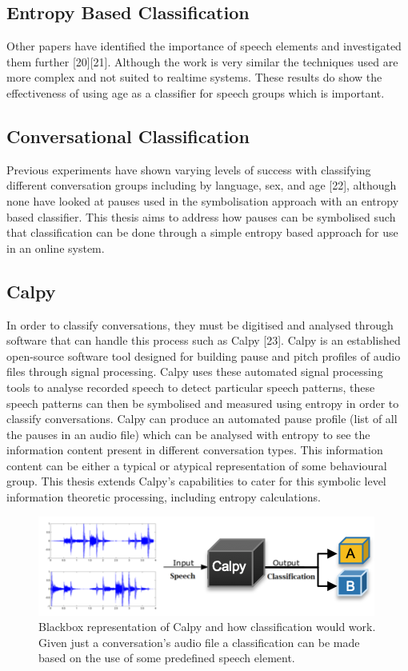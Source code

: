 \subsection{Entropy Based Classification}
Other papers have identified the importance of speech elements and investigated them further [20][21]. Although the work is very similar the techniques used are more complex and not suited to realtime systems. These results do show the effectiveness of using age as a classifier for speech groups which is important.

\subsection{Conversational Classification}
Previous experiments have shown varying levels of success with classifying different conversation groups including by language, sex, and age [22], although none have looked at pauses used in the symbolisation approach with an entropy based classifier. This thesis aims to address how pauses can be symbolised such that classification can be done through a simple entropy based approach for use in an online system. 

\subsection{Calpy}
In order to classify conversations, they must be digitised and analysed through software that can handle this process such as Calpy [23]. Calpy is an established open-source software tool designed for building pause and pitch profiles of audio files through signal processing. Calpy uses these automated signal processing tools to analyse recorded speech to detect particular speech patterns, these speech patterns can then be symbolised and measured using entropy in order to classify conversations. Calpy can produce an automated pause profile (list of all the pauses in an audio file) which can be analysed with entropy to see the information content present in different conversation types. This information content can be either a typical or atypical representation of some behavioural group. This thesis extends Calpy's capabilities to cater for this symbolic level information theoretic processing, including entropy calculations.

\begin{figure}
\begin{center}
\includegraphics{src/main-matter/introduction/fig/calpy-black-box}
\caption{Blackbox representation of Calpy and how classification would work. Given just a conversation's audio file a classification can be made based on the use of some predefined speech element.}
\label{default}
\end{center}
\end{figure}


